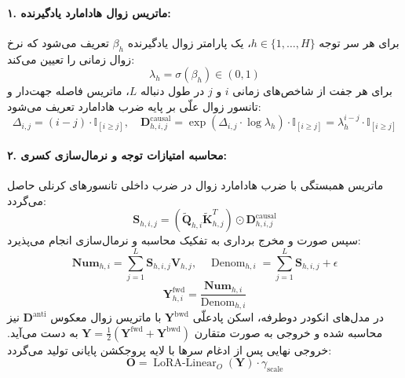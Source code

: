 \paragraph{۱. ماتریس زوال هادامارد یادگیرنده:}
برای هر سر توجه $h \in \{1, \dots, H\}$، یک پارامتر زوال یادگیرنده $\beta_h$ تعریف می‌شود که نرخ زوال زمانی را تعیین می‌کند:
\begin{equation}
\lambda_h = \sigma(\beta_h) \in (0, 1)
\end{equation}
برای هر جفت از شاخص‌های زمانی $i$ و $j$ در طول دنباله $L$، ماتریس فاصله جهت‌دار و تانسور زوال علّی بر پایه ضرب هادامارد تعریف می‌شود:
\begin{equation}
\Delta_{i, j} = (i - j) \cdot \mathbb{I}_{[i \ge j]}, \quad \mathbf{D}_{h, i, j}^{\text{causal}} = \exp\left( \Delta_{i, j} \cdot \log \lambda_h \right) \cdot \mathbb{I}_{[i \ge j]} = \lambda_h^{i - j} \cdot \mathbb{I}_{[i \ge j]}
\end{equation}

\paragraph{۲. محاسبه امتیازات توجه و نرمال‌سازی کسری:}
ماتریس همبستگی با ضرب هادامارد زوال در ضرب داخلی تانسورهای کرنلی حاصل می‌گردد:
\begin{equation}
\mathbf{S}_{h, i, j} = \left(\tilde{\mathbf{Q}}_{h, i} \tilde{\mathbf{K}}_{h, j}^T\right) \odot \mathbf{D}_{h, i, j}^{\text{causal}}
\end{equation}
سپس صورت و مخرج برداری به تفکیک محاسبه و نرمال‌سازی انجام می‌پذیرد:
\begin{equation}
\mathbf{Num}_{h, i} = \sum_{j=1}^L \mathbf{S}_{h, i, j} \mathbf{V}_{h, j}, \quad
\operatorname{Denom}_{h, i} = \sum_{j=1}^L \mathbf{S}_{h, i, j} + \epsilon
\end{equation}
\begin{equation}
\mathbf{Y}_{h, i}^{\text{fwd}} = \frac{\mathbf{Num}_{h, i}}{\operatorname{Denom}_{h, i}}
\end{equation}
در مدل‌های انکودر دوطرفه، اسکن پادعلّی $\mathbf{Y}^{\text{bwd}}$ با ماتریس زوال معکوس $\mathbf{D}^{\text{anti}}$ نیز محاسبه شده و خروجی به صورت متقارن $\mathbf{Y} = \frac{1}{2}(\mathbf{Y}^{\text{fwd}} + \mathbf{Y}^{\text{bwd}})$ به دست می‌آید. خروجی نهایی پس از ادغام سرها با لایه پروجکشن پایانی تولید می‌گردد:
\begin{equation}
\mathbf{O} = \operatorname{LoRA-Linear}_O(\mathbf{Y}) \cdot \gamma_{\text{scale}}
\end{equation}

